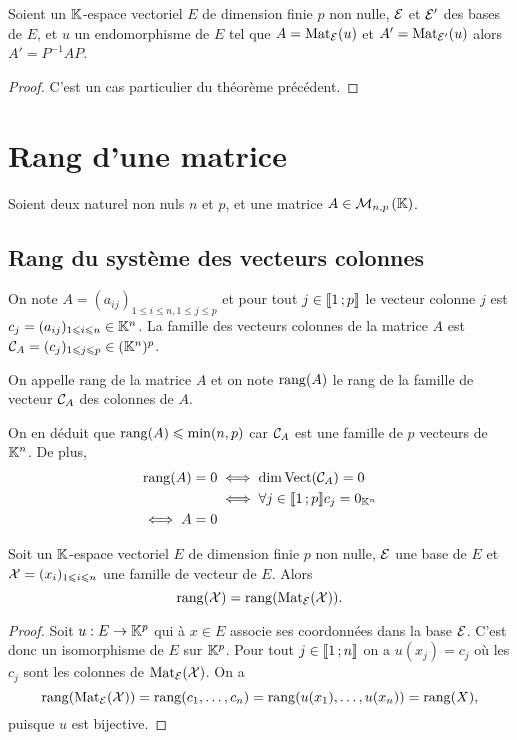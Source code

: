 \begin{theo}
  Soient un \(\mathbb{K}\)-espace vectoriel \(E\) de dimension finie \(p\) non 
  nulle, \(\mathcal{E}\) et \(\mathcal{E}'\) des bases de \(E\), et \(u\) un endomorphisme de 
  \(E\) tel que \(A=\mathrm{Mat}_{\mathcal{E}}(u)\) et \(A'=\mathrm{Mat}_{\mathcal{E}'}(u)\) alors 
  \(A'=P^{-1}AP\).
\end{theo}
\begin{proof}
  C'est un cas particulier du théorème précédent.
\end{proof}

\section{Rang d'une matrice}

Soient deux naturel non nuls \(n\) et \(p\), et une matrice \(A \in 
\mathcal{M}_{n,p}\left(\mathbb{K}\right)\).

\subsection{Rang du système des vecteurs colonnes}

On note \(A=(a_{ij})_{1\leqslant i\leqslant n, 1\leqslant j\leqslant p}\) et 
pour tout \(j \in \mathopen{\llbracket}1\mathclose{}\mathpunct{};p\mathclose{\rrbracket}\) le vecteur colonne \(j\) est 
\(c_j=(a_{ij})_{1 \leqslant i \leqslant n} \in \mathbb{K}^n\). La famille des 
vecteurs colonnes de la matrice \(A\) est \(\mathcal{C}_A=(c_j)_{1 \leqslant j 
\leqslant p} \in (\mathbb{K}^n)^p\).

\begin{defdef}
  On appelle rang de la matrice \(A\) et on note \(\operatorname{rang}(A)\)  le rang de la 
  famille de vecteur \(\mathcal{C}_A\) des colonnes de \(A\).
\end{defdef}

On en déduit que \(\operatorname{rang}(A) \leqslant \min(n,p)\) car \(\mathcal{C}_A\) est une 
famille de \(p\) vecteurs de \(\mathbb{K}^n\). De plus,
\begin{align*}
  \operatorname{rang}(A) = 0 &\iff \dim \operatorname{Vect}(\mathcal{C}_A)=0 \\
  &\iff \forall j \in \mathopen{\llbracket}1\mathclose{}\mathpunct{};p\mathclose{\rrbracket} c_j = 0_{\mathbb{K}^n} \\
  \iff A=0
\end{align*}

\begin{prop}
  Soit un \(\mathbb{K}\)-espace vectoriel \(E\) de dimension finie \(p\) non nulle, 
  \(\mathcal{E}\) une base de \(E\) et \(\mathcal{X}=(x_i)_{1\leqslant i\leqslant n}\) une 
  famille de vecteur de \(E\). Alors
  \begin{equation}
    \operatorname{rang}(\mathcal{X})=\operatorname{rang}(\mathrm{Mat}_{\mathcal{E}}(\mathcal{X})).
  \end{equation}
\end{prop}
\begin{proof}
  Soit \(u: E \rightarrow \mathbb{K}^p\) qui à \(x \in E\) associe ses coordonnées 
  dans la base \(\mathcal{E}\). C'est donc un isomorphisme de \(E\) sur \(\mathbb{K}^p\). 
  Pour tout \(j \in \mathopen{\llbracket}1\mathclose{}\mathpunct{};n\mathclose{\rrbracket}\) on a \(u(x_j)=c_j\) où les 
  \(c_j\) sont les colonnes de \(\mathrm{Mat}_{\mathcal{E}}(\mathcal{X})\). On a
  \begin{equation}
    \operatorname{rang}(\mathrm{Mat}_{\mathcal{E}}(\mathcal{X})) = \operatorname{rang}(c_1,\ldots,c_n) = 
    \operatorname{rang}(u(x_1),\ldots,u(x_n))=\operatorname{rang}(X),
  \end{equation}
  puisque \(u\) est bijective.
\end{proof}

